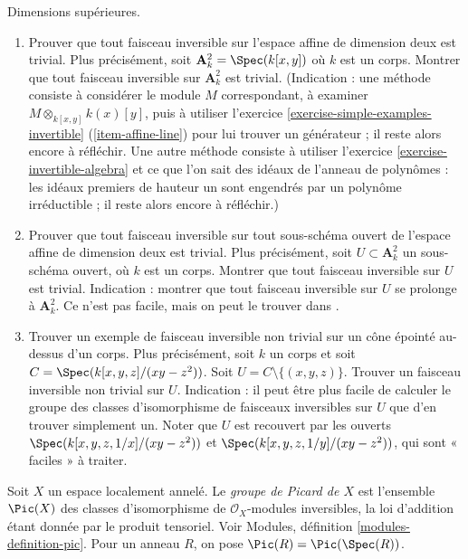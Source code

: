 \begin{exercise}
\label{exercise-higher-dimension-invertible}
Dimensions supérieures.
\begin{enumerate}
\item Prouver que tout faisceau inversible sur l'espace affine de dimension
deux est trivial. Plus précisément, soit
${\mathbf A}^2_k = \Spec(k[x, y])$ où $k$ est un corps.
Montrer que tout faisceau inversible sur ${\mathbf A}^2_k$ est trivial.
(Indication : une méthode consiste à considérer le module
$M$ correspondant, à examiner $M \otimes_{k[x, y]} k(x)[y]$, puis
à utiliser
l'exercice \ref{exercise-simple-examples-invertible} (\ref{item-affine-line})
pour lui trouver un générateur ; il reste alors encore à réfléchir.
Une autre méthode consiste à utiliser
l'exercice \ref{exercise-invertible-algebra}
et ce que l'on sait des idéaux de l'anneau
de polynômes : les idéaux premiers de hauteur un sont engendrés par un polynôme
irréductible ; il reste alors encore à réfléchir.)
\item Prouver que tout faisceau inversible sur tout sous-schéma
ouvert de l'espace affine de dimension deux est trivial. Plus précisément, soit
$U \subset {\mathbf A}^2_k$ un sous-schéma ouvert, où $k$ est un corps.
Montrer que tout faisceau inversible sur $U$ est trivial. Indication : montrer que tout
faisceau inversible sur $U$ se prolonge à ${\mathbf A}^2_k$. Ce n'est pas facile,
mais on peut le trouver dans \cite{H}.
\item Trouver un exemple de faisceau inversible non trivial
sur un cône épointé au-dessus d'un corps. Plus précisément,
soit $k$ un corps et soit $C = \Spec(k[x, y, z]/(xy-z^2))$.
Soit $U = C \setminus \{ (x, y, z) \}$. Trouver un faisceau inversible non trivial
sur $U$. Indication : il peut être plus facile de calculer le
groupe des classes d'isomorphisme de faisceaux inversibles sur $U$ que d'en
trouver simplement un. Noter que $U$ est recouvert par les ouverts
$\Spec(k[x, y, z, 1/x]/(xy-z^2))$ et
$\Spec(k[x, y, z, 1/y]/(xy-z^2))$,
qui sont « faciles » à traiter.
\end{enumerate}
\end{exercise}

\begin{definition}
\label{definition-picard-group}
Soit $X$ un espace localement annelé.
Le {\it groupe de Picard de $X$} est l'ensemble $\Pic(X)$
des classes d'isomorphisme de $\mathcal{O}_X$-modules inversibles,
la loi d'addition étant donnée par le produit tensoriel.
Voir Modules, définition \ref{modules-definition-pic}.
Pour un anneau $R$, on pose $\Pic(R) = \Pic(\Spec(R))$.
\end{definition}

